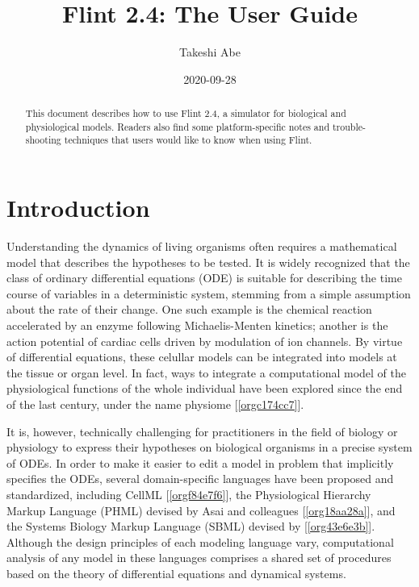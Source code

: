 \documentclass[a4paper,10pt]{report}
\author{Takeshi Abe}
\date{2020-09-28}
\title{Flint 2.4: The User Guide}
\begin{document}
\maketitle
\tableofcontents

\vfill

\doclicenseThis

\begin{abstract}
This document describes how to use Flint 2.4, a simulator for biological and physiological models.
Readers also find some platform-specific notes and trouble-shooting techniques that
users would like to know when using Flint.
\end{abstract}

\chapter{Introduction}
\label{sec:org43376c5}

Understanding the dynamics of living organisms often requires a mathematical model
that describes the hypotheses to be tested. It is widely recognized that the
class of ordinary differential equations (ODE) is suitable for describing the
time course of variables in a deterministic system, stemming from a simple
assumption about the rate of their change.
One such example is the chemical reaction accelerated by an enzyme
following Michaelis-Menten kinetics; another is the action potential of
cardiac cells driven by modulation of ion channels. By virtue of
differential equations, these celullar models can be integrated into models at the
tissue or organ level. In fact, ways to integrate a computational model of
the physiological functions of the whole individual have been explored since the
end of the last century, under the name physiome [\ref{orgc174cc7}].

It is, however, technically challenging for practitioners in the field of
biology or physiology to express their hypotheses on biological organisms in a
precise system of ODEs. In order to make it easier to edit a model in problem
that implicitly specifies the ODEs, several domain-specific languages have
been proposed and standardized, including CellML [\ref{orgf84e7f6}], the
Physiological Hierarchy Markup Language (PHML) devised by Asai and colleagues
[\ref{org18aa28a}], and the Systems Biology Markup Language (SBML) devised
by [\ref{org43e6e3b}]. Although the design principles of each modeling
language vary, computational analysis of any model in these languages
comprises a shared set of procedures based on the theory of differential
equations and dynamical systems.
\end{document}
